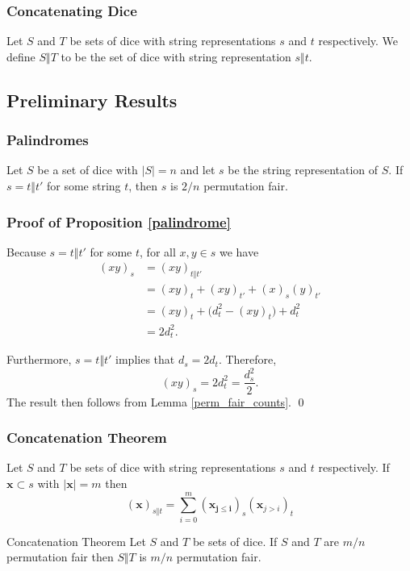 \documentclass[aspectratio=169]{beamer}
\begin{document}
\begin{frame}[triangle=siiblue]
\frametitle{Concatenating Dice}
\begin{siidefinition}{}{}
Let $S$ and $T$ be sets of dice with string representations $s$ and $t$ respectively.   We define $S \Vert T$ to be the set of dice with string representation $s \Vert t$. 
\end{siidefinition}
\end{frame}

\subsection{Preliminary Results}
\begin{frame}[triangle=siiblue]
\frametitle{Palindromes}
\begin{siiproposition}[label=palindrome]{}{}
Let $S$ be a set of dice with $|S| = n$ and let $s$ be the string representation of $S$.  If $s = t \Vert t'$ for some string $t$,  then $s$ is $2/n$ permutation fair. 
\end{siiproposition}
\end{frame}

\begin{frame}[triangle=siiblue]
\frametitle{Proof of Proposition \ref{palindrome}}
Because $s = t \Vert t'$ for some $t$, for all $x,y \in s$ we have 
\begin{equation}\nonumber
\begin{split}
(xy)_s &= (xy)_{t \Vert t'} \\
&= (xy)_t + (xy)_{t'} + (x)_s(y)_{t'} \\
&= (xy)_t + \big(d_t^2 - (xy)_t\big) + d_t^2 \\
&= 2d_t^2.
\end{split}
\end{equation}

\vfill

Furthermore, $s = t \Vert t'$ implies that $d_s = 2d_t$. Therefore,
\begin{equation*}
(xy)_s = 2d_t^2 = \frac{d_s^2}{2}.
\end{equation*}
The result then follows from Lemma \ref{perm_fair_counts}. \qed
\end{frame}


\begin{frame}[triangle=siiblue]
\frametitle{Concatenation Theorem}
\begin{siilemma}[label=perm_fair_cat_counts]{}{}
Let $S$ and $T$ be sets of dice with string representations $s$ and $t$ respectively. If $\mathbf{x} \subset s$ with $|\mathbf{x}| = m$ then
\begin{equation*}
(\mathbf{x})_{s \Vert t} = \sum_{i=0}^{m} (\mathbf{x_{j \leq i}})_s (\mathbf{x}_{j > i})_t
\end{equation*}
\end{siilemma}

\vfill
 
\begin{siitheorem}[label=mn_perm_fair]{Concatenation Theorem}{}
Let $S$ and $T$ be sets of dice. If $S$ and $T$ are $m/n$ permutation fair then $S \Vert T$ is $m/n$ permutation fair.
\end{siitheorem}
\end{frame}
\end{document}
